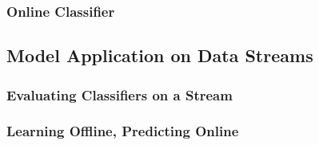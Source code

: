 \subsubsection*{Online Classifier}




\subsection{\label{sec:onlineApplication}Model Application on Data Streams}


\subsubsection{Evaluating Classifiers on a Stream}




\subsubsection{Learning Offline, Predicting Online}


